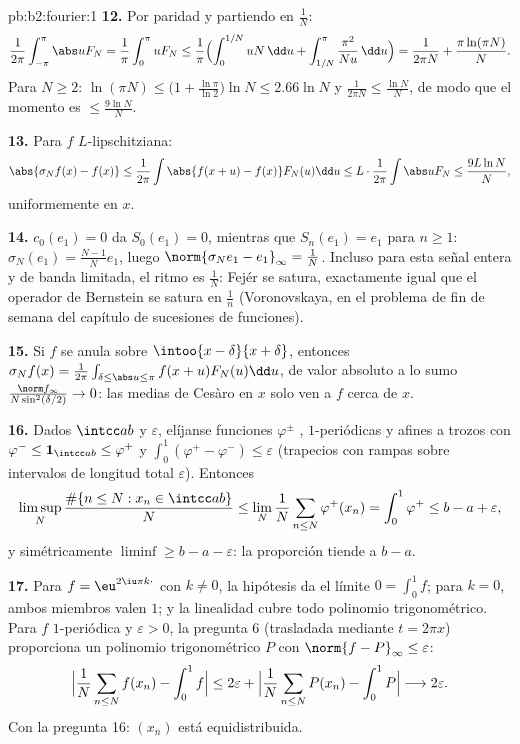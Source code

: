 \begin{solution}{pb:b2:fourier:1}
\textbf{12.} Por paridad y partiendo en $\frac1N$:
\[
\frac{1}{2\pi}\int_{-\pi}^{\pi}\abs uF_N
= \frac1\pi\int_0^\pi uF_N
\leq \frac1\pi\Bigl(\int_0^{1/N}uN\,\dd u +
\int_{1/N}^{\pi}\frac{\pi^2}{Nu}\,\dd u\Bigr)
= \frac{1}{2\pi N} + \frac{\pi\ln(\pi N)}{N} .
\]
Para $N \geq 2$: $\ln(\pi N) \leq \bigl(1 +
\frac{\ln\pi}{\ln2}\bigr)\ln N \leq 2.66\ln N$ y $\frac{1}{2\pi N}
\leq \frac{\ln N}{N}$, de modo que el momento es $\leq \frac{9\ln
N}{N}$.

\textbf{13.} Para $f$ $L$-lipschitziana:
\[
\abs{\sigma_Nf(x) - f(x)}
\leq \frac{1}{2\pi}\int\abs{f(x+u) - f(x)}F_N(u)\dd u
\leq L\cdot\frac{1}{2\pi}\int\abs uF_N
\leq \frac{9L\ln N}{N},
\]
uniformemente en $x$.

\textbf{14.} $c_0(e_1) = 0$ da $S_0(e_1) = 0$, mientras que $S_n(e_1)
= e_1$ para $n \geq 1$: $\sigma_N(e_1) = \frac{N-1}{N}e_1$, luego
$\norm{\sigma_Ne_1 - e_1}_\infty = \frac1N$. Incluso para esta señal
entera y de banda limitada, el ritmo es $\frac1N$: Fejér se satura,
exactamente igual que el operador de Bernstein se satura en $\frac1n$
(Voronovskaya, en el problema de fin de semana del capítulo de
sucesiones de funciones).

\textbf{15.} Si $f$ se anula sobre $\intoo{x-\delta}{x+\delta}$,
entonces $\sigma_Nf(x) = \frac{1}{2\pi}\int_{\delta \leq \abs u \leq
\pi}f(x+u)F_N(u)\dd u$, de valor absoluto a lo sumo $\frac{\norm
f_\infty}{N\sin^2(\delta/2)} \to 0$: las medias de Cesàro en $x$
solo ven a $f$ cerca de $x$.

\textbf{16.} Dados $\intcc ab$ y $\varepsilon$, elíjanse funciones
$\varphi^\pm$ , $1$-periódicas y afines a trozos con
$\varphi^- \leq \mathbf 1_{\intcc ab} \leq \varphi^+$ y
$\int_0^1(\varphi^+ - \varphi^-) \leq \varepsilon$ (trapecios con
rampas sobre intervalos de longitud total $\varepsilon$). Entonces
\[
\limsup_N\frac{\#\{n \leq N : x_n \in \intcc ab\}}{N}
\leq \lim_N\frac1N\sum_{n\leq N}\varphi^+(x_n)
= \int_0^1\varphi^+ \leq b - a + \varepsilon ,
\]
y simétricamente $\liminf \geq b - a - \varepsilon$: la proporción
tiende a $b - a$.

\textbf{17.} Para $f = \eu^{2\iu\pi k\cdot}$ con $k \neq 0$, la
hipótesis da el límite $0 = \int_0^1f$; para $k = 0$, ambos miembros
valen $1$; y la linealidad cubre todo polinomio trigonométrico. Para
$f$  $1$-periódica y $\varepsilon > 0$, la pregunta 6
(trasladada mediante $t = 2\pi x$) proporciona un polinomio
trigonométrico $P$ con $\norm{f - P}_\infty \leq \varepsilon$:
\[
\Bigl|\frac1N\sum_{n\leq N}f(x_n) - \int_0^1f\Bigr|
\leq 2\varepsilon +
\Bigl|\frac1N\sum_{n\leq N}P(x_n) - \int_0^1P\Bigr|
\longrightarrow 2\varepsilon .
\]
Con la pregunta 16: $(x_n)$ está equidistribuida.


\end{solution}
